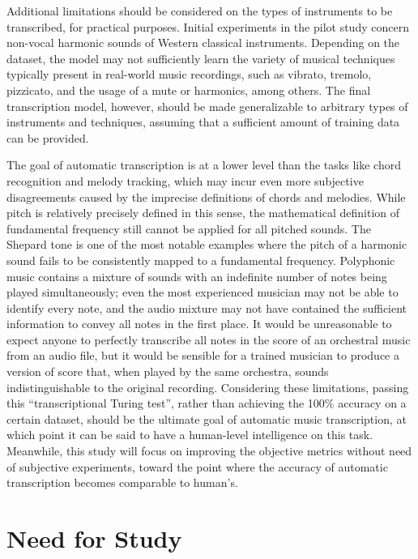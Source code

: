 Additional limitations should be considered on the types of instruments to be transcribed, for practical purposes.
Initial experiments in the pilot study concern non-vocal harmonic sounds of Western classical instruments.
Depending on the dataset, the model may not sufficiently learn the variety of musical techniques typically present in real-world music recordings, such as vibrato, tremolo, pizzicato, and the usage of a mute or harmonics, among others.
The final transcription model, however, should be made generalizable to arbitrary types of instruments and techniques, assuming that a sufficient amount of training data can be provided.


The goal of automatic transcription is at a lower level than the tasks like chord recognition and melody tracking, which may incur even more subjective disagreements caused by the imprecise definitions of chords and melodies.
While pitch is relatively precisely defined in this sense, the mathematical definition of fundamental frequency still cannot be applied for all pitched sounds.
The Shepard tone \cite{shepard1964circularity} is one of the most notable examples where the pitch of a harmonic sound fails to be consistently mapped to a fundamental frequency.
Polyphonic music contains a mixture of sounds with an indefinite number of notes being played simultaneously; even the most experienced musician may not be able to identify every note, and the audio mixture may not have contained the sufficient information to convey all notes in the first place.
It would be unreasonable to expect anyone to perfectly transcribe all notes in the score of an orchestral music from an audio file, but it would be sensible for a trained musician to produce a version of score that, when played by the same orchestra, sounds indistinguishable to the original recording.
Considering these limitations, passing this ``transcriptional Turing test'', rather than achieving the 100\% accuracy on a certain dataset, should be the ultimate goal of automatic music transcription, at which point it can be said to have a human-level intelligence on this task.
Meanwhile, this study will focus on improving the objective metrics without need of subjective experiments, toward the point where the accuracy of automatic transcription becomes comparable to human's.



\section{Need for Study}

